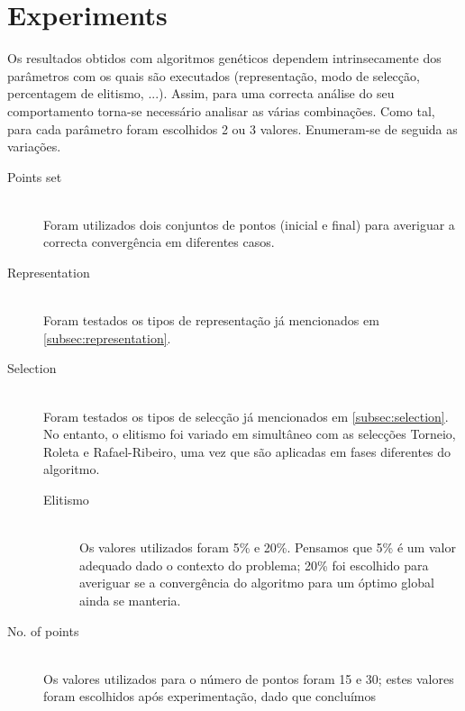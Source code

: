 \documentclass[a4paper]{article}
\begin{document}
\cleardoublepage

\section{Experiments}
\indent \indent Os resultados obtidos com algoritmos genéticos dependem intrinsecamente dos parâmetros com os quais são executados
(representação, modo de selecção, percentagem de elitismo, ...). Assim, para uma correcta análise do seu comportamento
torna-se necessário analisar as várias combinações. Como tal, para cada parâmetro foram escolhidos 2 ou 3 valores.
Enumeram-se de seguida as variações.

\begin{description}
	\item [Points set] \hfill \\
		\indent Foram utilizados dois conjuntos de pontos (inicial e final) para averiguar a correcta convergência em diferentes casos.
			\begin{description}
				\item \[ P_{init} = (0.0, 3.0),\quad P_{final} = (4.0, 2.0) \]
				\item \[ P_{init} = (0.0, 3.0),\quad P_{final} = (4.0, 2.8) \]
			\end{description}
	\item [Representation] \hfill \\
		\indent Foram testados os tipos de representação já mencionados em \ref{subsec:representation}.
	\item [Selection] \hfill \\
		\indent Foram testados os tipos de selecção já mencionados em \ref{subsec:selection}. No entanto, o elitismo foi variado em simultâneo com
		as selecções Torneio, Roleta e Rafael-Ribeiro, uma vez que são aplicadas em fases diferentes do algoritmo.
	\begin{description}
		\item [Elitismo] \hfill \\
			\indent Os valores utilizados foram 5\% e 20\%. Pensamos que 5\% é um valor adequado dado o contexto do problema; 20\%
			foi escolhido para averiguar se a convergência do algoritmo para um óptimo global ainda se manteria.
	\end{description}
	\item [No. of points] \hfill \\
		\indent Os valores utilizados para o número de pontos foram 15 e 30; estes valores foram escolhidos após experimentação, dado que concluímos

\end{description}
\end{document}
